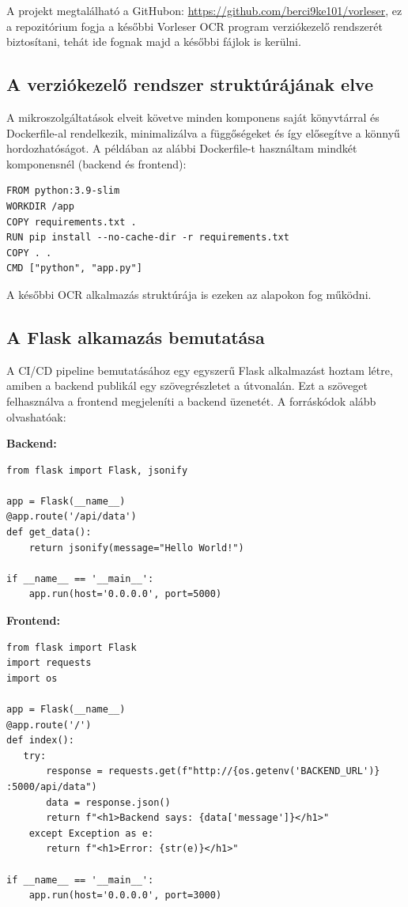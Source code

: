 \documentclass[12pt]{article}
\begin{document}
	A projekt megtalálható a GitHubon: \url{https://github.com/berci9ke101/vorleser}, ez a repozitórium fogja a későbbi Vorleser OCR program verziókezelő rendszerét biztosítani, tehát ide fognak majd a későbbi fájlok is kerülni.
	
	\subsection{A verziókezelő rendszer struktúrájának elve}
	
	A mikroszolgáltatások elveit követve minden komponens saját könyvtárral és Dockerfile-al rendelkezik, minimalizálva a függőségeket és így elősegítve a könnyű hordozhatóságot. A példában az alábbi Dockerfile-t használtam mindkét komponensnél (backend és frontend):
	
	\begin{verbatim}
FROM python:3.9-slim
WORKDIR /app
COPY requirements.txt .
RUN pip install --no-cache-dir -r requirements.txt
COPY . .
CMD ["python", "app.py"]
	\end{verbatim}
	
	A későbbi OCR alkalmazás struktúrája is ezeken az alapokon fog működni.
	
	\subsection{A Flask alkamazás bemutatása}
	A CI/CD pipeline bemutatásához egy egyszerű Flask alkalmazást hoztam létre, amiben a backend publikál egy szövegrészletet a  útvonalán. Ezt a szöveget felhasználva a frontend megjeleníti a backend üzenetét. A forráskódok alább olvashatóak:
	
	\textbf{Backend:}
	\begin{verbatim}
from flask import Flask, jsonify

app = Flask(__name__)
@app.route('/api/data')
def get_data():
    return jsonify(message="Hello World!")

if __name__ == '__main__':
    app.run(host='0.0.0.0', port=5000)
 	\end{verbatim}
 	
	\textbf{Frontend:}
 	\begin{verbatim}
from flask import Flask
import requests
import os

app = Flask(__name__)
@app.route('/')
def index():
   try:
       response = requests.get(f"http://{os.getenv('BACKEND_URL')} :5000/api/data")
       data = response.json()
       return f"<h1>Backend says: {data['message']}</h1>"
    except Exception as e:
       return f"<h1>Error: {str(e)}</h1>"

if __name__ == '__main__':
    app.run(host='0.0.0.0', port=3000)
 	\end{verbatim}
 	
\end{document}
